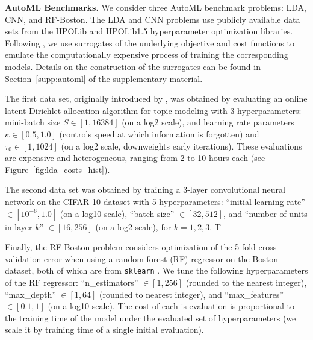 \textbf{AutoML Benchmarks.} We consider three AutoML benchmark problems: LDA, CNN, and RF-Boston. The LDA and CNN problems use publicly available data sets from the HPOLib \citep{hpolib} and HPOLib1.5 \citep{hpolib15} hyperparameter optimization libraries. Following \cite{eggensperger2018efficient}, we use  surrogates of the underlying objective and cost functions to emulate the computationally expensive process of training the corresponding models. Details on the construction of the surrogates can be found in Section~\ref{supp:automl} of the supplementary material. 

The first data set, originally introduced by \cite{hoffman2010online}, was obtained by evaluating an online latent Dirichlet allocation algorithm for topic modeling with 3 hyperparameters: mini-batch size $S \in [1, 16384]$ (on a log2 scale), and learning rate parameters $\kappa \in [0.5, 1.0]$ (controls speed at which information is forgotten) and $\tau_0 \in [1, 1024]$ (on a log2 scale, downweights early iterations). These evaluations are expensive and heterogeneous, ranging from 2 to 10 hours each (see Figure~\ref{fig:lda_costs_hist}). 

The second data set was obtained by training a 3-layer convolutional neural network on the CIFAR-10 dataset with 5 hyperparameters: ``initial learning rate'' $\in [10^{-6}, 1.0]$ (on a log10 scale), ``batch size'' $\in [32, 512]$, and ``number of units in layer $k$'' $\in [16, 256]$ (on a log2 scale), for $k=1,2,3$. T

Finally, the RF-Boston problem considers optimization of the 5-fold cross validation error when using a random forest (RF) regressor
on the Boston dataset, both of which are from \texttt{sklearn} \citep{scikit-learn}.
We tune the following hyperparameters of the RF regressor: ``n\_estimators'' $\in [1, 256]$ (rounded to the nearest integer), ``max\_depth'' $\in [1, 64]$ (rounded to nearest integer), and ``max\_features'' $\in [0.1, 1]$ (on a log10 scale). The cost of each is evaluation is proportional to the training time of the model under the evaluated set of hyperparameters (we scale it by training time of a single initial evaluation). 



